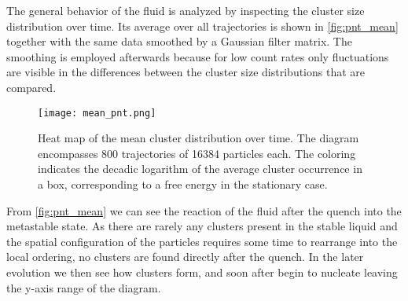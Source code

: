 The general behavior of the fluid is analyzed by inspecting the cluster size distribution over time. Its average over all trajectories is shown in \autoref{fig:pnt_mean} together with the same data smoothed by a Gaussian filter matrix. The smoothing is employed afterwards because for low count rates only fluctuations are visible in the differences between the cluster size distributions that are compared.\\

\begin{figure}[h!]
\centering
\texttt{[image: mean\_pnt.png]}
\caption[Gaussian filter applied to cluster size distribution]{Heat map of the mean cluster distribution over time. The diagram encompasses 800 trajectories of 16384 particles each. The coloring indicates the decadic logarithm of the average cluster occurrence in a box, corresponding to a free energy in the stationary case.}
\label{fig:pnt_mean}
\end{figure}

From \autoref{fig:pnt_mean} we can see the reaction of the fluid after the quench into the metastable state. As there are rarely any clusters present in the stable liquid and the spatial configuration of the particles requires some time to rearrange into the local ordering, no clusters are found directly after the quench. In the later evolution we then see how clusters form, and soon after begin to nucleate leaving the y-axis range of the diagram.\\

